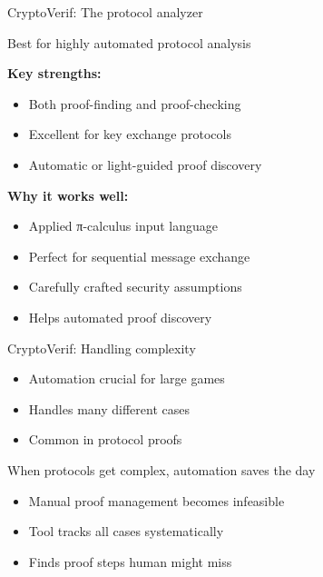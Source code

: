 \documentclass[aspectratio=169, lualatex, handout]{beamer}
\begin{document}
\begin{frame}{CryptoVerif: The protocol analyzer}
	\begin{center}
		\Large
		Best for highly automated protocol analysis
	\end{center}
	\vspace{1em}
	\textbf{Key strengths:}
	\begin{itemize}
		\item Both proof-finding and proof-checking
		\item Excellent for key exchange protocols
		\item Automatic or light-guided proof discovery
	\end{itemize}
	\vspace{0.5em}
	\textbf{Why it works well:}
	\begin{itemize}
		\item Applied π-calculus input language
		\item Perfect for sequential message exchange
		\item Carefully crafted security assumptions
		\item Helps automated proof discovery
	\end{itemize}
\end{frame}

\begin{frame}{CryptoVerif: Handling complexity}
	\begin{itemize}
		\item Automation crucial for large games
		\item Handles many different cases
		\item Common in protocol proofs
	\end{itemize}
	\vspace{1em}
	\begin{center}
		\Large
		When protocols get complex, automation saves the day
	\end{center}
	\vspace{1em}
	\begin{itemize}
		\item Manual proof management becomes infeasible
		\item Tool tracks all cases systematically
		\item Finds proof steps human might miss
	\end{itemize}
\end{frame}
\end{document}

